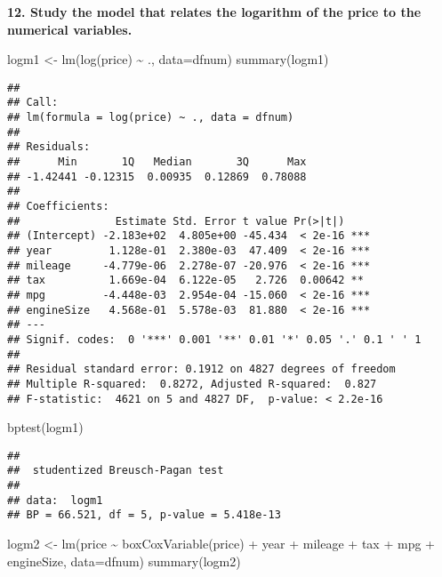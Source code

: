 \documentclass[
]{article}
\newenvironment{Shaded}{\begin{snugshade}}{\end{snugshade}}
\newcommand{\AttributeTok}[1]{\textcolor[rgb]{0.77,0.63,0.00}{#1}}
\newcommand{\FunctionTok}[1]{\textcolor[rgb]{0.00,0.00,0.00}{#1}}
\newcommand{\NormalTok}[1]{#1}
\newcommand{\OtherTok}[1]{\textcolor[rgb]{0.56,0.35,0.01}{#1}}
\newcommand{\SpecialCharTok}[1]{\textcolor[rgb]{0.00,0.00,0.00}{#1}}
\begin{document}
\textbf{12. Study the model that relates the logarithm of the price to the numerical variables.}

\begin{Shaded}
\begin{Highlighting}[]
\NormalTok{logm1 }\OtherTok{\textless{}{-}} \FunctionTok{lm}\NormalTok{(}\FunctionTok{log}\NormalTok{(price) }\SpecialCharTok{\textasciitilde{}}\NormalTok{ ., }\AttributeTok{data=}\NormalTok{dfnum)}
\FunctionTok{summary}\NormalTok{(logm1)}
\end{Highlighting}
\end{Shaded}

\begin{verbatim}
## 
## Call:
## lm(formula = log(price) ~ ., data = dfnum)
## 
## Residuals:
##      Min       1Q   Median       3Q      Max 
## -1.42441 -0.12315  0.00935  0.12869  0.78088 
## 
## Coefficients:
##               Estimate Std. Error t value Pr(>|t|)    
## (Intercept) -2.183e+02  4.805e+00 -45.434  < 2e-16 ***
## year         1.128e-01  2.380e-03  47.409  < 2e-16 ***
## mileage     -4.779e-06  2.278e-07 -20.976  < 2e-16 ***
## tax          1.669e-04  6.122e-05   2.726  0.00642 ** 
## mpg         -4.448e-03  2.954e-04 -15.060  < 2e-16 ***
## engineSize   4.568e-01  5.578e-03  81.880  < 2e-16 ***
## ---
## Signif. codes:  0 '***' 0.001 '**' 0.01 '*' 0.05 '.' 0.1 ' ' 1
## 
## Residual standard error: 0.1912 on 4827 degrees of freedom
## Multiple R-squared:  0.8272, Adjusted R-squared:  0.827 
## F-statistic:  4621 on 5 and 4827 DF,  p-value: < 2.2e-16
\end{verbatim}

\begin{Shaded}
\begin{Highlighting}[]
\FunctionTok{bptest}\NormalTok{(logm1)}
\end{Highlighting}
\end{Shaded}

\begin{verbatim}
## 
##  studentized Breusch-Pagan test
## 
## data:  logm1
## BP = 66.521, df = 5, p-value = 5.418e-13
\end{verbatim}

\begin{Shaded}
\begin{Highlighting}[]
\NormalTok{logm2 }\OtherTok{\textless{}{-}} \FunctionTok{lm}\NormalTok{(price }\SpecialCharTok{\textasciitilde{}} \FunctionTok{boxCoxVariable}\NormalTok{(price) }\SpecialCharTok{+}\NormalTok{ year }\SpecialCharTok{+}\NormalTok{ mileage }\SpecialCharTok{+}\NormalTok{ tax }\SpecialCharTok{+}\NormalTok{ mpg }\SpecialCharTok{+}\NormalTok{ engineSize, }\AttributeTok{data=}\NormalTok{dfnum)}
\FunctionTok{summary}\NormalTok{(logm2)}
\end{Highlighting}
\end{Shaded}
\end{document}
